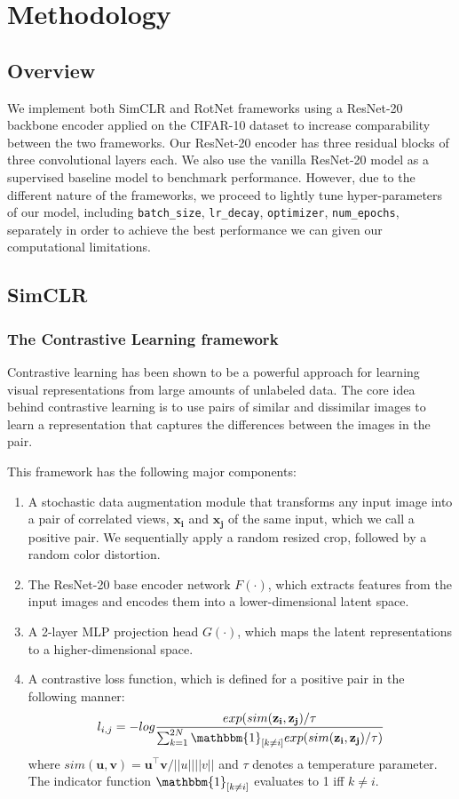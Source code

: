\section{Methodology}


\label{method}

\subsection{Overview}
We implement both SimCLR and RotNet frameworks using a ResNet-20 backbone encoder applied on the CIFAR-10 dataset to increase comparability between the two frameworks. Our ResNet-20 encoder has three residual blocks of three convolutional layers each. We also use the vanilla ResNet-20 model as a supervised baseline model to benchmark performance. However, due to the different nature of the frameworks, we proceed to lightly tune hyper-parameters of our model, including \texttt{batch\_size}, \texttt{lr\_decay}, \texttt{optimizer}, \texttt{num\_epochs}, separately in order to achieve the best performance we can given our computational limitations. 

\subsection{SimCLR}

\subsubsection{The Contrastive Learning framework}
Contrastive learning has been shown to be a powerful approach for learning visual representations from large amounts of unlabeled data. The core idea behind contrastive learning is to use pairs of similar and dissimilar images to learn a representation that captures the differences between the images in the pair.

This framework has the following major components:

\begin{enumerate}
    \item A stochastic data augmentation module that transforms any input image into a pair of correlated views, $\mathbf{x_i}$ and $\mathbf{x_j}$ of the same input, which we call a positive pair. We sequentially apply a random resized crop, followed by a random color distortion. 
    \item The ResNet-20 base encoder network $F(\cdot)$, which extracts features from the input images and encodes them into a lower-dimensional latent space.
    \item A 2-layer MLP projection head $G(\cdot)$, which maps the latent representations to a higher-dimensional space.
    \item A contrastive loss function, which is defined for a positive pair in the following manner:
    $$ l_{i,j} = - log \frac{exp(sim(\mathbf{z_i},\mathbf{z_j})/\tau}{\sum_{k=1}^{2N} \mathbbm{1}_{[k \neq i]} exp(sim(\mathbf{z_i},\mathbf{z_j})/\tau)}$$
    where $sim(\mathbf{u},\mathbf{v}) = \mathbf{u}^\top \mathbf{v}/||u|| ||v||$ and $\tau$ denotes a temperature parameter. The indicator function $\mathbbm{1}_{[k \neq i]}$ evaluates to 1 iff $k \neq i$.
\end{enumerate}


